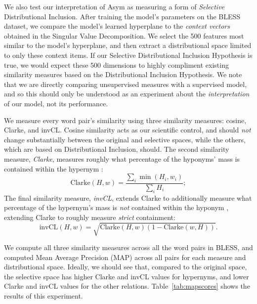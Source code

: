 We also test our interpretation of Asym as measuring a form of {\em Selective}
Distributional Inclusion. After training the model's parameters on the BLESS
dataset, we compare the model's learned hyperplane to the {\em context
vectors} obtained in the Singular Value Decomposition. We select the 500
features most similar to the model's hyperplane, and then extract a
distributional space limited to only these context items. If our Selective
Distributional Inclusion Hypothesis is true, we would expect these 500
dimensions to highly compliment existing similarity measures based on the
Distributional Inclusion Hypothesis. We note that we are directly comparing
unsupervised measures with a supervised model, and so this should only be
understood as an experiment about the {\em interpretation} of our model, not
its performance.

We measure every word pair's similarity using three similarity measures:
cosine, Clarke, and invCL. Cosine similarity acts as our scientific control, and
should {\em not} change substantially between the
original and selective spaces, while the others, which are
based on Distributional Inclusion, should. The second similarity measure,
{\em Clarke}, measures roughly what percentage of the hyponyms' mass is contained
within the hypernym \cite{clarke:2009:gems}:
\begin{equation*}
  \text{Clarke}(H, w) = \frac{\sum_i \min(H_i, w_i)}{\sum_i H_i};
\end{equation*}
The final similarity measure, {\em invCL}, extends Clarke to additionally
measure what percentage of the hypernym's mass is {\em not} contained within
the hyponym \cite{lenci:2012:starsem}, extending Clarke to roughly measure
{\em strict} containment:
\begin{equation*}
  \text{invCL}(H, w) = \sqrt{\text{Clarke}(H, w)(1 - \text{Clarke}(w, H))}.
\end{equation*}

We compute all three similarity measures across all the word pairs in BLESS,
and computed Mean Average Precision (MAP) across all pairs for each measure
and distributional space. Ideally, we should see that, compared to the original
space, the selective space has higher Clarke and invCL values
for hypernyms, and lower Clarke and invCL values for the other relations.
Table~\ref{tab:mapscores} shows the results of this experiment.


